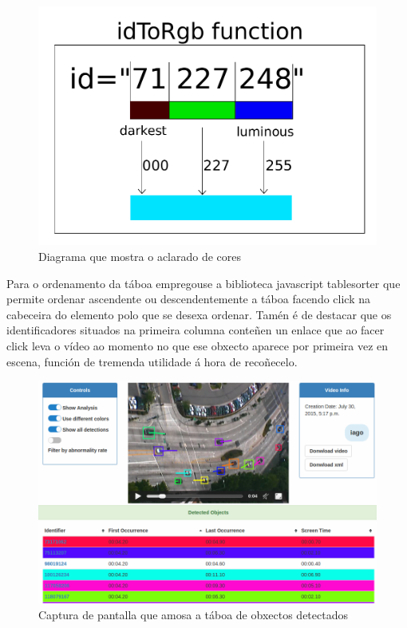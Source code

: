         \begin{figure}[htp]
        \begin{center}
            \includegraphics[scale=0.5]{figures/lightColor.pdf}
            \caption{Diagrama que mostra o aclarado de cores}
        \label{fig:lightColor}
        \end{center}
        \end{figure}

        Para o ordenamento da táboa empregouse a biblioteca javascript tablesorter que permite ordenar
        ascendente ou descendentemente a táboa facendo click na cabeceira do elemento polo que se desexa
        ordenar. Tamén é de destacar que os identificadores situados na primeira columna conteñen un 
        enlace que ao facer click leva o vídeo ao momento no que ese obxecto aparece por primeira vez en
        escena, función de tremenda utilidade á hora de recoñecelo.
        
        \begin{figure}[htp]
        \begin{center}
            \includegraphics[scale=0.4]{figures/DetectionsTable.png}
            \caption{Captura de pantalla que amosa a táboa de obxectos detectados}
        \label{fig:DetectionsTable}
        \end{center}
        \end{figure}
        
